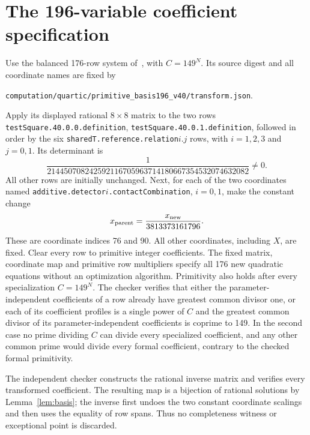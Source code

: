 \documentclass[11pt,a4paper]{article}
\begin{document}
\section{The 196-variable coefficient specification}
Use the balanced 176-row system of~\cite{Parent196}, with $C=149^N$.
Its source digest and all coordinate names are fixed by
\begin{center}\small
\nolinkurl{computation/quartic/primitive_basis196_v40/transform.json}.
\end{center}
Apply its displayed rational $8\times8$ matrix to the two rows
\texttt{testSquare.40.0.0.definition},
\texttt{testSquare.40.0.1.definition}, followed in order by the six
\texttt{sharedT.reference.relation}$i$.$j$ rows, with
$i=1,2,3$ and $j=0,1$. Its determinant is
\[
             \frac1{214450708242592116705963714180667354532074632082}\ne0.
\]
All other rows are initially unchanged. Next, for each of the two
coordinates named \texttt{additive.detector}$i$\texttt{.contactCombination},
$i=0,1$, make the constant change
\[
                   x_{\rm parent}=\frac{x_{\rm new}}{3813373161796}.
\]
These are coordinate indices 76 and 90. All other coordinates, including
$X$, are fixed. Clear every row to primitive integer coefficients.
The fixed matrix, coordinate map and primitive row multipliers specify
all 176 new quadratic equations without an optimization algorithm.
Primitivity also holds after every specialization $C=149^N$.
The checker verifies that either the parameter-independent coefficients
of a row already have greatest common divisor one, or each of its
coefficient profiles is a single power of $C$ and the greatest common
divisor of its parameter-independent coefficients is coprime to 149.
In the second case no prime dividing $C$ can divide every specialized
coefficient, and any other common prime would divide every formal
coefficient, contrary to the checked formal primitivity.

The independent checker constructs the rational inverse matrix and
verifies every transformed coefficient. The resulting map is a bijection
of rational solutions by Lemma~\ref{lem:basis}; the inverse first undoes
the two constant coordinate scalings and then uses the equality of row
spans. Thus no completeness witness or exceptional point is discarded.
\end{document}

